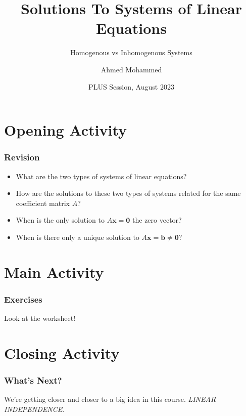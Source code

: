 \documentclass{beamer}
\title{Solutions To Systems of Linear Equations}
\subtitle{Homogenous vs Inhomogenous Systems}
\author{Ahmed Mohammed}
\date{PLUS Session, August 2023}
\institute{Georgia Institute of Technology}
\renewcommand{\vec}[1]{\bm{#1}}
\begin{document}
	\begin{frame}
		\maketitle
	\end{frame}
	
	\section{Opening Activity}
	\begin{frame}
		\frametitle{Revision}
		\begin{itemize}[<+(1)->]
			\item What are the two types of systems of linear equations?
			\item How are the solutions to these two types of systems related for the same coefficient matrix \(A\)?
			\item When is the only solution to \(A\vec{x} = \vec{0}\) the zero vector?
			\item When is there only a unique solution to \(A\vec{x} = \vec{b} \ne \vec{0}\)?
		\end{itemize}
	\end{frame}

	\section{Main Activity}
	\begin{frame}
		\frametitle{Exercises}
		\centering
		Look at the worksheet!
	\end{frame}

	\section{Closing Activity}
	\begin{frame}
		\frametitle{What's Next?}
		We're getting closer and closer to a big idea in this course. \pause
		\centering \textsl{LINEAR INDEPENDENCE}.
	\end{frame}
\end{document}
